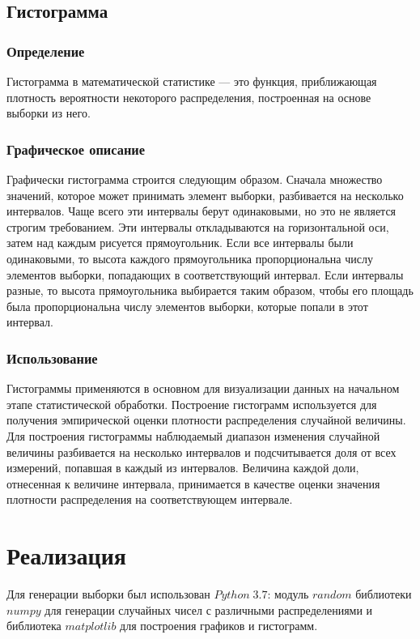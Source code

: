 \documentclass[a4]{article}
\begin{document}
		\subsection{Гистограмма}
			\subsubsection{Определение}
				Гистограмма в математической статистике — это функция, приближающая
				плотность вероятности некоторого распределения, построенная на основе
				выборки из него.

		
			\subsubsection{Графическое описание}
				Графически гистограмма строится следующим образом. Сначала множество значений, которое может принимать элемент выборки, разбивается на
				несколько интервалов. Чаще всего эти интервалы берут одинаковыми, но
				это не является строгим требованием. Эти интервалы откладываются на
				горизонтальной оси, затем над каждым рисуется прямоугольник. Если все
				интервалы были одинаковыми, то высота каждого прямоугольника пропорциональна числу элементов выборки, попадающих в соответствующий
				интервал. Если интервалы разные, то высота прямоугольника выбирается
				таким образом, чтобы его площадь была пропорциональна числу элементов
				выборки, которые попали в этот интервал.
			\subsubsection{Использование}
				Гистограммы применяются в основном для визуализации данных на начальном этапе статистической обработки.
				Построение гистограмм используется для получения эмпирической оценки
				плотности распределения случайной величины. Для построения гистограммы наблюдаемый диапазон изменения случайной величины разбивается на
				несколько интервалов и подсчитывается доля от всех измерений, попавшая
				в каждый из интервалов. Величина каждой доли, отнесенная к величине
				интервала, принимается в качестве оценки значения плотности распределения на соответствующем интервале.
				
	\section{Реализация}
	Для генерации выборки был использован $Python\;3.7$: модуль $random$ библиотеки $numpy$ для генерации случайных чисел с различными распределениями и библиотека $matplotlib$ для построения графиков и гистограмм.
\end{document}
